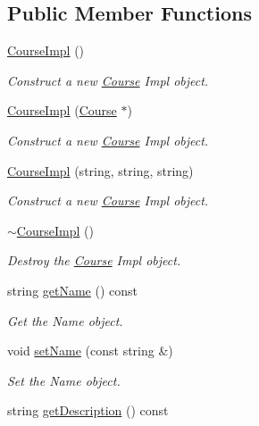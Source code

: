 \subsection*{Public Member Functions}
\begin{DoxyCompactItemize}
\item 
\hyperlink{classCourseImpl_a1f90c3b1232d808f1adfd22700ae0c36}{Course\+Impl} ()
\begin{DoxyCompactList}\small\item\em Construct a new \hyperlink{classCourse}{Course} Impl object. \end{DoxyCompactList}\item 
\hyperlink{classCourseImpl_a2d4d21ad889d02d6ad25827fa7d87e59}{Course\+Impl} (\hyperlink{classCourse}{Course} $\ast$)
\begin{DoxyCompactList}\small\item\em Construct a new \hyperlink{classCourse}{Course} Impl object. \end{DoxyCompactList}\item 
\hyperlink{classCourseImpl_ad762665b174957dbdecd37945b52e41d}{Course\+Impl} (string, string, string)
\begin{DoxyCompactList}\small\item\em Construct a new \hyperlink{classCourse}{Course} Impl object. \end{DoxyCompactList}\item 
\hyperlink{classCourseImpl_a113b20eec8d5dbd8ce66e596ff467477}{$\sim$\+Course\+Impl} ()
\begin{DoxyCompactList}\small\item\em Destroy the \hyperlink{classCourse}{Course} Impl object. \end{DoxyCompactList}\item 
string \hyperlink{classCourseImpl_ab1f1244e63d4d2938f1640d7ef308319}{get\+Name} () const
\begin{DoxyCompactList}\small\item\em Get the Name object. \end{DoxyCompactList}\item 
void \hyperlink{classCourseImpl_af831a30978ba95ab38c90cb82d14ed7b}{set\+Name} (const string \&)
\begin{DoxyCompactList}\small\item\em Set the Name object. \end{DoxyCompactList}\item 
string \hyperlink{classCourseImpl_adff450841bfdf955061e01088d67f948}{get\+Description} () const

\end{DoxyCompactItemize}
